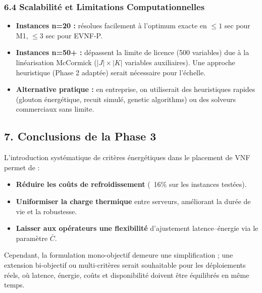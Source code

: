 \documentclass{article}
\begin{document}
\subsubsection{6.4 Scalabilité et Limitations Computationnelles}

\begin{itemize}
    \item \textbf{Instances n=20 :} résolues facilement à l'optimum exacte en $\leq 1$ sec pour M1, $\leq 3$ sec pour EVNF-P.
    \item \textbf{Instances n=50+ :} dépassent la limite de licence (500 variables) due à la linéarisation McCormick ($|J| \times |K|$ variables auxiliaires). Une approche heuristique (Phase 2 adaptée) serait nécessaire pour l'échelle.
    \item \textbf{Alternative pratique :} en entreprise, on utiliserait des heuristiques rapides (glouton énergétique, recuit simulé, genetic algorithms) ou des solveurs commerciaux sans limite.
\end{itemize}

\subsection{7. Conclusions de la Phase 3}

L'introduction systématique de critères énergétiques dans le placement de VNF permet de :
\begin{itemize}
    \item \textbf{Réduire les coûts de refroidissement} (~16\% sur les instances testées).
    \item \textbf{Uniformiser la charge thermique} entre serveurs, améliorant la durée de vie et la robustesse.
    \item \textbf{Laisser aux opérateurs une flexibilité} d'ajustement latence--énergie via le paramètre $\bar{C}$.
\end{itemize}

Cependant, la formulation mono-objectif demeure une simplification ; une extension bi-objectif ou multi-critères serait souhaitable pour les déploiements réels, où latence, énergie, coûts et disponibilité doivent être équilibrés en même temps.
\end{document}
